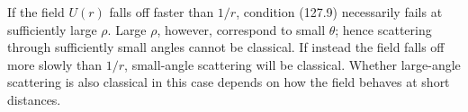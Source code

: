 If the field $U(r)$ falls off faster than $1/r$, condition (127.9) necessarily fails at sufficiently large $\rho$. Large $\rho$, however, correspond to small $\theta$; hence scattering through sufficiently small angles cannot be classical. If instead the field falls off more slowly than $1/r$, small-angle scattering will be classical. Whether large-angle scattering is also classical in this case depends on how the field behaves at short distances.
